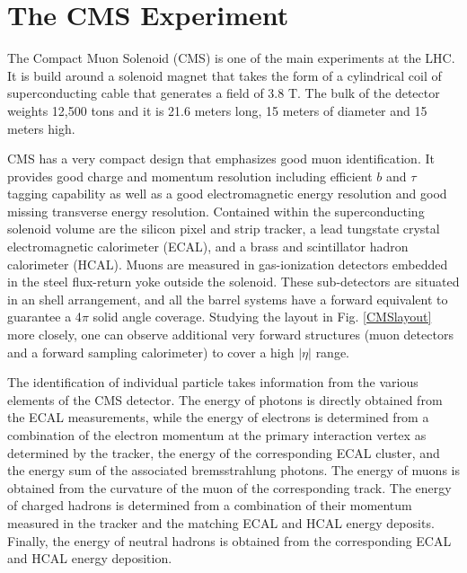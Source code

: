 \section{The CMS Experiment}
The Compact Muon Solenoid (CMS) \cite{Bayatian:2006zz,Ball:2007zza} is one of the main experiments at the LHC. It is build around a solenoid magnet that takes the form of a cylindrical coil of superconducting cable that generates a field of 3.8 T. The bulk of the detector weights 12,500 tons and it is 21.6 meters long, 15 meters of diameter and 15 meters high.



CMS has a very compact design that emphasizes good muon identification. It provides good charge and momentum resolution including efficient $b$ and $\tau$ tagging capability as well as a good electromagnetic energy resolution and good missing transverse energy resolution. Contained within the superconducting solenoid volume are the silicon pixel and strip tracker, a lead tungstate crystal electromagnetic calorimeter (ECAL), and a brass and scintillator hadron calorimeter (HCAL). Muons are measured in gas-ionization detectors embedded in the steel flux-return yoke outside the solenoid. These sub-detectors are situated in an shell arrangement, and all the barrel systems have a forward equivalent to guarantee a 4$\pi$ solid angle coverage. Studying the layout in Fig. \ref{CMSlayout} more closely, one can observe additional very forward structures (muon detectors and a forward sampling calorimeter) to cover a high $|\eta|$ range. 

The identification of individual particle takes information from the various elements of the CMS detector. The energy of photons is directly obtained from the ECAL measurements, while the energy of electrons is determined from a combination of the electron momentum at the primary interaction vertex as determined by the tracker, the energy of the corresponding ECAL cluster, and the energy sum of the associated bremsstrahlung photons. The energy of muons is obtained from the curvature of the muon of the corresponding track. The energy of charged hadrons is determined from a combination of their momentum measured in the tracker and the matching ECAL and HCAL energy deposits. Finally, the energy of neutral hadrons is obtained from the corresponding ECAL and HCAL energy deposition.

